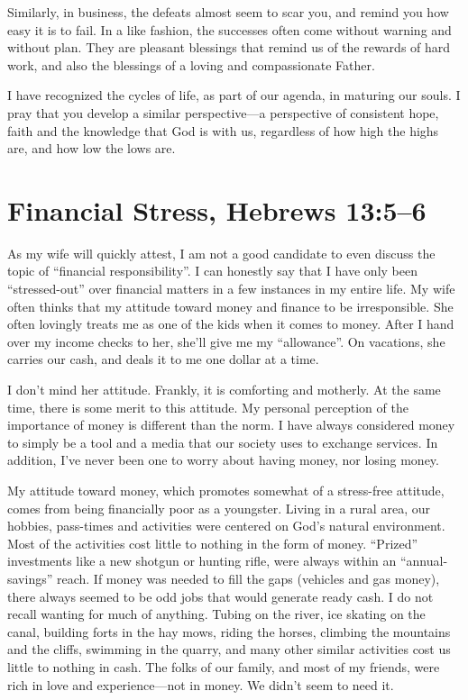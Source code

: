 \documentclass[12pt]{memoir}
\begin{document}
Similarly, in business, the defeats almost seem to scar you, and remind
you how easy it is to fail. In a like fashion, the successes often
come without warning and without plan. They are pleasant blessings
that remind us of the rewards of hard work, and also the blessings
of a loving and compassionate Father.

I have recognized the cycles of life, as part of our agenda, in maturing
our souls. I pray that you develop a similar perspective---a perspective
of consistent hope, faith and the knowledge that God is with us, regardless
of how high the highs are, and how low the lows are. 

\section{Financial Stress, Hebrews 13:5--6}

As my wife will quickly attest, I am not a good candidate to even
discuss the topic of ``financial responsibility''. I can honestly
say that I have only been ``stressed-out'' over financial matters
in a few instances in my entire life. My wife often thinks that my
attitude toward money and finance to be irresponsible. She often lovingly
treats me as one of the kids when it comes to money. After I hand
over my income checks to her, she'll give me my ``allowance''. On
vacations, she carries our cash, and deals it to me one dollar at
a time. 

I don't mind her attitude. Frankly, it is comforting and motherly.
At the same time, there is some merit to this attitude. My personal
perception of the importance of money is different than the norm.
I have always considered money to simply be a tool and a media that
our society uses to exchange services. In addition, I've never been
one to worry about having money, nor losing money. 

My attitude toward money, which promotes somewhat of a stress-free
attitude, comes from being financially poor as a youngster. Living
in a rural area, our hobbies, pass-times and activities were centered
on God's natural environment. Most of the activities cost little to
nothing in the form of money. ``Prized'' investments like a new
shotgun or hunting rifle, were always within an ``annual-savings''
reach. If money was needed to fill the gaps (vehicles and gas money),
there always seemed to be odd jobs that would generate ready cash.
I do not recall wanting for much of anything. Tubing on the river,
ice skating on the canal, building forts in the hay mows, riding the
horses, climbing the mountains and the cliffs, swimming in the quarry,
and many other similar activities cost us little to nothing in cash.
The folks of our family, and most of my friends, were rich in love
and experience---not in money. We didn't seem to need it. 
\end{document}
